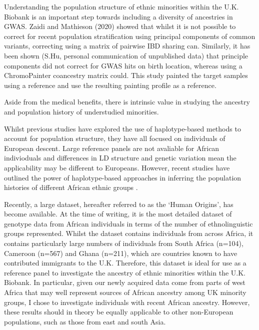 Understanding the population structure of ethnic minorities within the U.K. Biobank is an important step towards including a diversity of ancestries in GWAS. Zaidi and Mathieson (2020) \cite{zaidi2020demographic} showed that whilst it is not possible to correct for recent population stratification using principal components of common variants, correcting using a matrix of pairwise IBD sharing can. Similarly, it has been shown (S.Hu, personal communication of unpublished data) that principle components did not correct for GWAS hits on birth location, whereas using a ChromoPainter coancestry matrix could. This study painted the target samples using a reference and use the resulting painting profile as a reference.

Aside from the medical benefits, there is intrinsic value in studying the ancestry and population history of understudied minorities. 

Whilst previous studies have explored the use of haplotype-based methods to account for population structure, they have all focused on individuals of European descent. Large reference panels are not avaliable for African indivioduals and differences in LD structure and genetic variation mean the applicability may be different to Europeans. However, recent studies have outlined the power of haplotype-based approaches in inferring the population histories of different African ethnic groups \cite{lopez2021evidence, StructureEthiopians2021}.

Recently, a large dataset, hereafter referred to as the `Human Origins', has become available. At the time of writing, it is the most detailed dataset of genotype data from African individuals in terms of the number of ethnolinguistic groups represented. Whilst the dataset contains individuals from across Africa, it contains particularly large numbers of individuals from South Africa (n=104), Cameroon (n=567) and Ghana (n=211), which are countries known to have contributed immigrants to the U.K. Therefore, this dataset is ideal for use as a reference panel to investigate the ancestry of ethnic minorities within the U.K. Biobank. In particular, given our newly acquired data come from parts of west Africa that may well represent sources of African ancestry among UK minority groups, I chose to investigate individuals with recent African ancestry. However, these results should in theory be equally applicable to other non-European populations, such as those from east and south Asia. 

